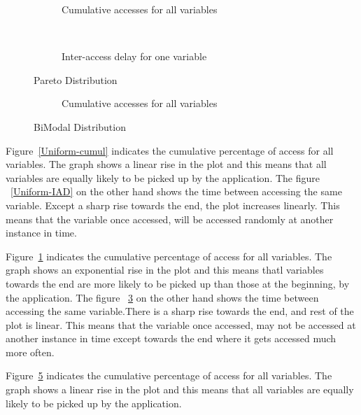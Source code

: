 \begin{figure}
        \centering
        \begin{subfigure}[b]{0.4\textwidth}
                \centering
                \caption{Cumulative accesses for all variables} \label{Pareto-cumul}
        \end{subfigure}
        ~~~ %
        \begin{subfigure}[b]{0.4\textwidth}
                \centering
                \caption{Inter-access delay for one variable} \label{Pareto-IAD}
        \end{subfigure}
        \caption{Pareto Distribution}
\end{figure}

\begin{figure}
        \centering
        \begin{subfigure}[b]{0.4\textwidth}
                \centering
                \caption{Cumulative accesses for all variables} \label{BiModal-cumul}
        \end{subfigure}
        \caption{BiModal Distribution}
\end{figure}

Figure~\ref{Uniform-cumul} indicates the cumulative percentage of access for all variables. The graph shows a linear rise in the plot and this means that all variables are equally likely to be picked up by the application. The figure ~\ref{Uniform-IAD} on the other hand shows the time between accessing the same variable. Except a sharp rise towards the end, the plot increases linearly. This means that the variable once accessed, will be accessed randomly at another instance in time. 

Figure~\ref{Pareto-cumul} indicates the cumulative percentage of access for all variables. The graph shows an exponential rise in the plot and this means thatl variables towards the end are more likely to be picked up than those at the beginning, by the application. The figure ~\ref{Pareto-IAD} on the other hand shows the time between accessing the same variable.There is a sharp rise towards the end, and rest of the plot is linear. This means that the variable once accessed, may not be accessed at another instance in time except towards the end where it gets accessed much more often.

Figure~\ref{BiModal-cumul} indicates the cumulative percentage of access for all variables. The graph shows a linear rise in the plot and this means that all variables are equally likely to be picked up by the application.



